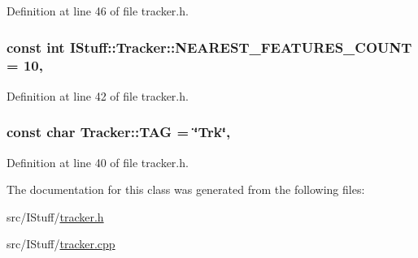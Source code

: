 Definition at line 46 of file tracker.\-h.

\hypertarget{class_i_stuff_1_1_tracker_a7bd424308b6879e92434378e653c8bdc}{
\subsubsection[{N\-E\-A\-R\-E\-S\-T\-\_\-\-F\-E\-A\-T\-U\-R\-E\-S\-\_\-\-C\-O\-U\-N\-T}]{\setlength{\rightskip}{0pt plus 5cm}const int I\-Stuff\-::\-Tracker\-::\-N\-E\-A\-R\-E\-S\-T\-\_\-\-F\-E\-A\-T\-U\-R\-E\-S\-\_\-\-C\-O\-U\-N\-T = 10\hspace{0.3cm}{\ttfamily [static]}, {\ttfamily [private]}}}\label{class_i_stuff_1_1_tracker_a7bd424308b6879e92434378e653c8bdc}


Definition at line 42 of file tracker.\-h.

\hypertarget{class_i_stuff_1_1_tracker_a68ef6bf09dbf9db7a6788ed899edb28d}{
\subsubsection[{T\-A\-G}]{\setlength{\rightskip}{0pt plus 5cm}const char Tracker\-::\-T\-A\-G = \char`\"{}Trk\char`\"{}\hspace{0.3cm}{\ttfamily [static]}, {\ttfamily [private]}}}\label{class_i_stuff_1_1_tracker_a68ef6bf09dbf9db7a6788ed899edb28d}


Definition at line 40 of file tracker.\-h.



The documentation for this class was generated from the following files\-:\begin{DoxyCompactItemize}
\item 
src/\-I\-Stuff/\hyperlink{tracker_8h}{tracker.\-h}\item 
src/\-I\-Stuff/\hyperlink{tracker_8cpp}{tracker.\-cpp}\end{DoxyCompactItemize}
